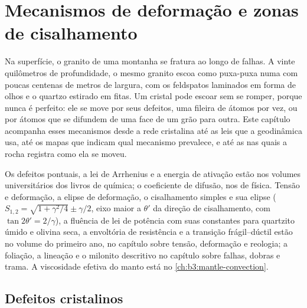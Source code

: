 \chapter{Mecanismos de deformação e zonas de cisalhamento}\label{ch:b3:deformation-mechanisms}

Na superfície, o granito de uma montanha se fratura ao longo de falhas. A vinte
quilômetros de profundidade, o mesmo granito escoa como puxa-puxa numa  com
poucas centenas de metros de largura, com os feldspatos laminados em forma de olhos e o quartzo
estirado em fitas. Um cristal pode escoar sem se romper, porque nunca é perfeito:
ele se move por seus defeitos, uma fileira de átomos por vez, ou por átomos que se difundem
de uma face de um grão para outra. Este capítulo acompanha esses mecanismos desde a
rede cristalina até as leis que a geodinâmica usa, até os mapas que indicam qual
mecanismo prevalece, e até as  nas quais a rocha registra como ela se moveu.

\begin{recall}
Os defeitos pontuais, a lei de Arrhenius e a energia de ativação estão nos volumes
universitários dos livros de química; o coeficiente de difusão, nos de física. Tensão e
deformação, a elipse de deformação, o cisalhamento simples e sua elipse
($S_{1,2} = \sqrt{1 + \gamma^2/4} \pm \gamma/2$, eixo maior a $\theta'$ da direção de
cisalhamento, com $\tan2\theta' = 2/\gamma$), a fluência de lei de potência com suas
constantes para quartzito úmido e olivina seca, a envoltória de resistência e a
transição frágil--dúctil estão no volume do primeiro ano, no capítulo sobre
tensão, deformação e reologia; a foliação, a lineação e o milonito descritivo no
capítulo sobre falhas, dobras e trama. A viscosidade efetiva do manto
está no \cref{ch:b3:mantle-convection}.
\end{recall}

\section{Defeitos cristalinos}


